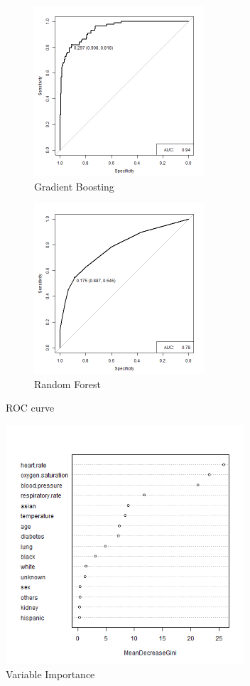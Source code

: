 \documentclass[twoside,11pt]{article}
\begin{document}
\begin{figure}[htbp]
\begin{subfigure}{.5\textwidth}
	\centering 
	\includegraphics[width=2.5in]{gbm_sepsis_auc.png} 
	\caption{Gradient Boosting}
	\label{fig:gbm_sepsis} 
\end{subfigure}%
\begin{subfigure}{.5\textwidth}
	\centering 
	\includegraphics[width=2.5in]{rf_sepsis_auc.png} 
	\caption{Random Forest}
	\label{fig:rf_sepsis} 
\end{subfigure}
\caption{ROC curve}
\label{fig:fig}
\end{figure}  

\begin{figure}[htbp]
	\centering
	\includegraphics[width=3.5in]{rf_var_sepsis.png} 
	\caption{Variable Importance}
	\label{fig:var}
\end{figure}
\end{document}

